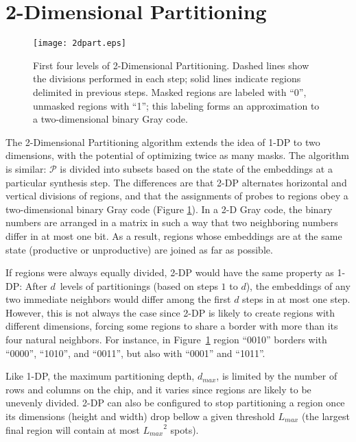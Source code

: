 \section{2-Dimensional Partitioning}
\label{sec:part_2d}

\begin{figure}[t]\centering
\texttt{[image: 2dpart.eps]}
\caption{\label{fig:2dpart}%
  First four levels of 2-Dimensional Partitioning. Dashed lines show the
  divisions performed in each step; solid lines indicate regions delimited in
  previous steps. Masked regions are labeled with ``0'', unmasked regions with
  ``1''; this labeling forms an approximation to a two-dimensional binary Gray
  code.}%
\end{figure}

The 2-Dimensional Partitioning algorithm extends the idea of 1-DP to two
dimensions, with the potential of optimizing twice as many masks. The algorithm
is similar: $\mathcal{P}$ is divided into subsets based on the state of the
embeddings at a particular synthesis step. The differences are that 2-DP
alternates horizontal and vertical divisions of regions, and that the
assignments of probes to regions obey a two-dimensional binary Gray code (Figure
\ref{fig:2dpart}). In a 2-D Gray code, the binary numbers are arranged in a
matrix in such a way that two neighboring numbers differ in at most one bit. As
a result, regions whose embeddings are at the same state (productive or
unproductive) are joined as far as possible.

If regions were always equally divided, 2-DP would have the same property as 1-
DP: After $d$~levels of partitionings (based on steps $1$ to $d$), the
embeddings of any two immediate neighbors would differ among the first $d$ steps
in at most one step. However, this is not always the case since 2-DP is likely
to create regions with different dimensions, forcing some regions to share a
border with more than its four natural neighbors. For instance, in
Figure~\ref{fig:2dpart} region ``0010'' borders with ``0000'', ``1010'', and
``0011'', but also with ``0001'' and ``1011''.

Like 1-DP, the maximum partitioning depth, $d_{max}$, is limited by the number
of rows and columns on the chip, and it varies since regions are likely to be
unevenly divided. 2-DP can also be configured to stop partitioning a region once
its dimensions (height and width) drop bellow a given threshold $L_{max}$ (the
largest final region will contain at most ${L_{max}}^2$ spots).

